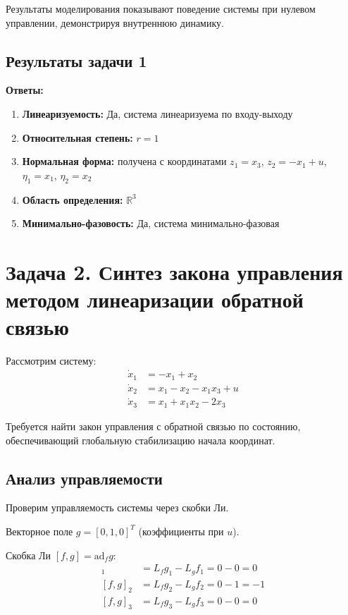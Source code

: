 Результаты моделирования показывают поведение системы при нулевом управлении, демонстрируя внутреннюю динамику.

\subsection*{Результаты задачи 1}

\textbf{Ответы:}
\begin{enumerate}
\item \textbf{Линеаризуемость:} Да, система линеаризуема по входу-выходу
\item \textbf{Относительная степень:} $r = 1$
\item \textbf{Нормальная форма:} получена с координатами $z_1 = x_3$, $z_2 = -x_1 + u$, $\eta_1 = x_1$, $\eta_2 = x_2$
\item \textbf{Область определения:} $\mathbb{R}^3$
\item \textbf{Минимально-фазовость:} Да, система минимально-фазовая
\end{enumerate}

\section*{Задача 2. Синтез закона управления методом линеаризации обратной связью}

Рассмотрим систему:
\begin{align}
\dot{x}_1 &= -x_1 + x_2 \\
\dot{x}_2 &= x_1 - x_2 - x_1 x_3 + u \\
\dot{x}_3 &= x_1 + x_1 x_2 - 2x_3
\end{align}

Требуется найти закон управления с обратной связью по состоянию, обеспечивающий глобальную стабилизацию начала координат.

\subsection*{Анализ управляемости}

Проверим управляемость системы через скобки Ли.

Векторное поле $g = [0, 1, 0]^T$ (коэффициенты при $u$).

Скобка Ли $[f, g] = \text{ad}_f g$:
\begin{align}
[f, g]_1 &= L_f g_1 - L_g f_1 = 0 - 0 = 0 \\
[f, g]_2 &= L_f g_2 - L_g f_2 = 0 - 1 = -1 \\
[f, g]_3 &= L_f g_3 - L_g f_3 = 0 - 0 = 0
\end{align}

